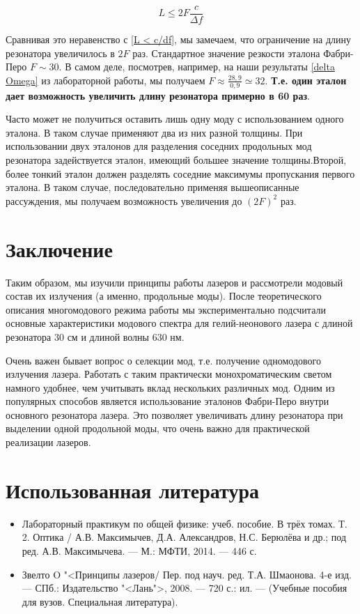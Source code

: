 \documentclass[12pt]{kiarticle}
\begin{document}
\begin{equation}\label{}
L \leq 2F \dfrac{c}{\Delta f}
\end{equation}

Сравнивая это неравенство с \eqref{L < c/df}, мы замечаем, что ограничение на длину резонатора увеличилось в $ 2F $ раз. Стандартное значение резкости эталона Фабри-Перо $ F \sim 30 $. В самом деле, посмотрев, например, на наши результаты \eqref{delta Omega} из лабораторной работы, мы получаем $ F \approx \frac{28,9}{0,9} \simeq 32 $. \textbf{Т.е. один эталон дает возможность увеличить длину резонатора примерно в 60 раз}. 

Часто может не получиться оставить лишь одну моду с использованием одного эталона. В таком случае применяют два из них разной толщины. При использовании двух эталонов для разделения соседних продольных мод резонатора задействуется эталон, имеющий большее значение толщины.Второй, более тонкий эталон должен разделять соседние максимумы пропускания первого эталона. В таком случае, последовательно применяя вышеописанные рассуждения, мы получаем возможность увеличения до $ (2F)^2 $ раз. 

\section{Заключение}

Таким образом, мы изучили принципы работы лазеров и рассмотрели модовый состав их излучения (а именно, продольные моды). После теоретического описания многомодового режима работы мы экспериментально подсчитали основные характеристики модового спектра для гелий-неонового лазера с длиной резонатора 30 см и длиной волны 630 нм. 

Очень важен бывает вопрос о селекции мод, т.е. получение одномодового излучения лазера. Работать с таким практически монохроматическим светом намного удобнее, чем учитывать вклад нескольких различных мод. 
 Одним из популярных способов является использование эталонов Фабри-Перо внутри основного резонатора лазера. Это позволяет увеличивать длину резонатора при выделении одной продольной моды, что очень важно для практической реализации лазеров. 

\section*{Использованная литература}

\begin{itemize}
	
	\item Лабораторный практикум по общей физике: учеб. пособие. В трёх томах. Т. 2. Оптика / А.В. Максимычев, Д.А. Александров, Н.С. Берюлёва и др.; под ред. А.В. Максимычева. --- М.: МФТИ, 2014. --- 446 с.
	
	\item Звелто O "<Принципы лазеров/ Пер. под науч. ред. Т.А. Шмаонова. 4-е изд. --- СПб.: Издательство "<Лань">, 2008. --- 720 с.: ил. --- (Учебные пособия для вузов. Специальная литература).
	
\end{itemize}
\end{document}

